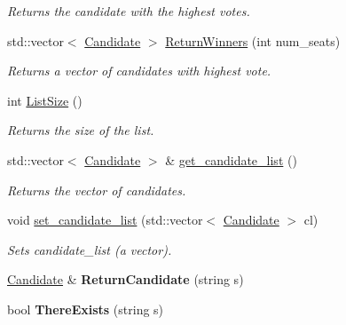 \begin{DoxyCompactItemize}
\begin{DoxyCompactList}\small\item\em Returns the candidate with the highest votes. \end{DoxyCompactList}\item 
std\+::vector$<$ \hyperlink{class_candidate}{Candidate} $>$ \hyperlink{class_candidate_list_abfdc825213700c4fe146dba1ec599d0d}{Return\+Winners} (int num\+\_\+seats)
\begin{DoxyCompactList}\small\item\em Returns a vector of candidates with highest vote. \end{DoxyCompactList}\item 
int \hyperlink{class_candidate_list_abc2c790e8597f07e047bdb73e981da52}{List\+Size} ()\hypertarget{class_candidate_list_abc2c790e8597f07e047bdb73e981da52}{}\label{class_candidate_list_abc2c790e8597f07e047bdb73e981da52}

\begin{DoxyCompactList}\small\item\em Returns the size of the list. \end{DoxyCompactList}\item 
std\+::vector$<$ \hyperlink{class_candidate}{Candidate} $>$ \& \hyperlink{class_candidate_list_ad1af8464cd59a666efe876302d79b043}{get\+\_\+candidate\+\_\+list} ()\hypertarget{class_candidate_list_ad1af8464cd59a666efe876302d79b043}{}\label{class_candidate_list_ad1af8464cd59a666efe876302d79b043}

\begin{DoxyCompactList}\small\item\em Returns the vector of candidates. \end{DoxyCompactList}\item 
void \hyperlink{class_candidate_list_a541bbc8c8b05edadc46c72567a5c446a}{set\+\_\+candidate\+\_\+list} (std\+::vector$<$ \hyperlink{class_candidate}{Candidate} $>$ cl)
\begin{DoxyCompactList}\small\item\em Sets candidate\+\_\+list (a vector). \end{DoxyCompactList}\item 
\hyperlink{class_candidate}{Candidate} \& {\bfseries Return\+Candidate} (string s)\hypertarget{class_candidate_list_ae2aec43811ad71df57b14cd234cad959}{}\label{class_candidate_list_ae2aec43811ad71df57b14cd234cad959}

\item 
bool {\bfseries There\+Exists} (string s)\hypertarget{class_candidate_list_a130f3c30b4800fc768674497272b91fb}{}\label{class_candidate_list_a130f3c30b4800fc768674497272b91fb}

\end{DoxyCompactItemize}


